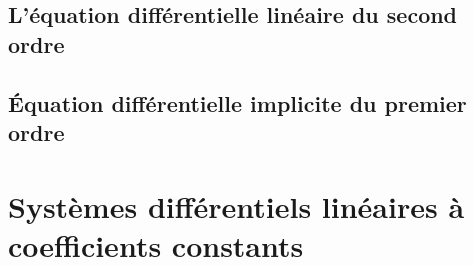 
					\subsection{L'équation différentielle linéaire du second ordre}


					\subsection{Équation différentielle implicite du premier ordre}


					\section{Systèmes différentiels linéaires à coefficients constants}



